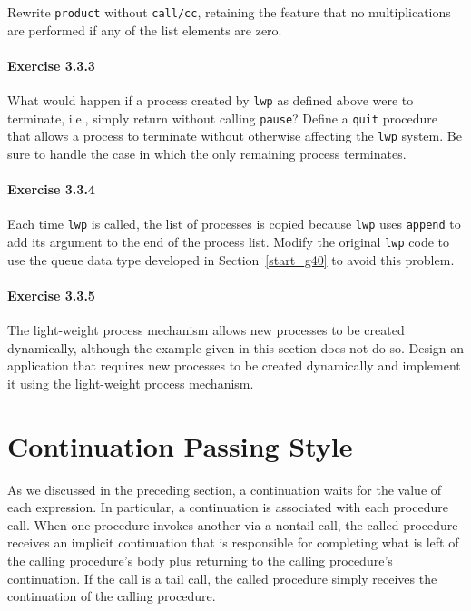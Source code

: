 \label{further_s67}Rewrite \texttt{product} without \texttt{call/cc}, retaining the feature that no
multiplications are performed if any of the list elements are zero.




\paragraph{Exercise \label{further_g72}3.3.3}


\label{further_s68}What would happen if a process created by \texttt{lwp} as defined above
were to terminate, i.e., simply return without calling
\texttt{pause}?
Define a \texttt{quit} procedure that allows a process to terminate
without otherwise affecting the \texttt{lwp} system.
Be sure to handle the case in which the only remaining process
terminates.




\paragraph{Exercise \label{further_g73}3.3.4}


\label{further_s69}Each time \texttt{lwp} is called, the list of processes is copied
because \texttt{lwp} uses \texttt{append} to add its argument to the
end of the process list.
Modify the original \texttt{lwp} code to
use the queue data type developed in Section \ref{start_g40}
to avoid this problem.




\paragraph{Exercise \label{further_g74}3.3.5}


\label{further_s70}The light-weight process mechanism allows new processes to be created
dynamically, although the example given in this section does not
do so.
Design an application that requires new processes to be created
dynamically and implement it using the light-weight process mechanism.



\section{\label{further_g75}\label{further_h4}Continuation Passing Style\label{further_SECTGFCPS}}



\label{further_s71}\label{further_s72}As we discussed in the
preceding section, a continuation
waits for the value of each expression.
In particular, a continuation is associated with each procedure call.
When one procedure invokes another via a nontail call, the called
procedure receives an implicit continuation that is responsible for
completing what is left of the calling procedure's body plus returning
to the calling procedure's continuation.
If the call is a tail call, the called procedure simply receives
the continuation of the calling procedure.


